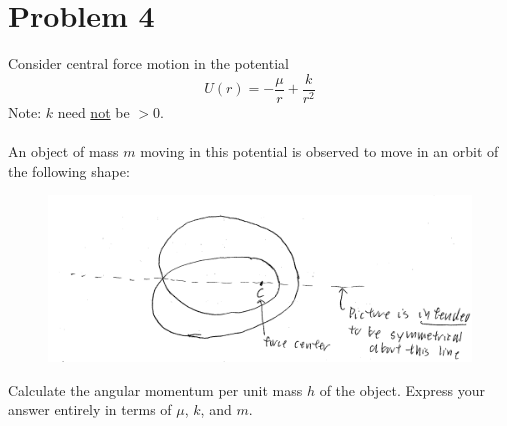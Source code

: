 \documentclass[12pt]{article}
\begin{document}
\section*{Problem 4}
Consider central force motion in the potential
\begin{equation}
    U(r) = -\frac{\mu}{r} + \frac{k}{r^2}
\end{equation}
Note: $k$ need \underline{not} be $>0$. \\ \\
An object of mass $m$ moving in this potential is observed to move in an orbit of the following shape: \\
\begin{figure}[H]
    \includegraphics{Problem4}
    \centering
\end{figure}
Calculate the angular momentum per unit mass $h$ of the object. Express your answer entirely in terms of $\mu$, $k$, and $m$.
\end{document}
